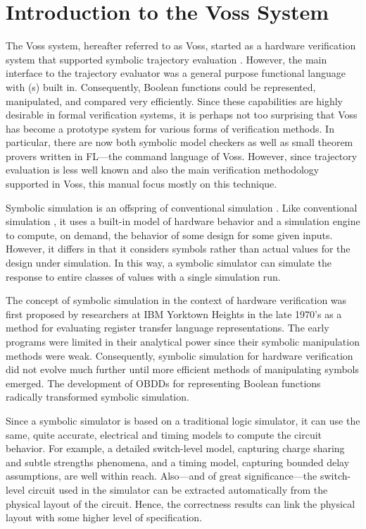 \section{Introduction to the Voss System}

The Voss system, hereafter referred to as Voss, started as a hardware
verification system that supported symbolic trajectory evaluation%
%
{}.
However, the main interface to the trajectory evaluator was a
general purpose functional language%
%
{} with
(s) built in. Consequently, Boolean functions could be
represented, manipulated, and compared very efficiently. Since
these capabilities are highly desirable in formal verification
systems, it is perhaps not too surprising that Voss has become a
prototype system for various forms of verification methods. In
particular, there are now both symbolic model checkers%
%
{} as well as
small theorem provers%
%
{} written in FL---the command language of Voss.
However, since trajectory evaluation is less well known and also
the main verification methodology supported in Voss, this manual
focus mostly on this technique.

Symbolic simulation is an offspring of conventional simulation%
%
{}.
Like conventional simulation%
%
{}, it uses a built-in model of hardware
behavior and a simulation engine%
%
{} to compute, on demand, the behavior
of some design for some given inputs. However, it differs in that
it considers symbols rather than actual values for the design under
simulation. In this way, a symbolic simulator can simulate the
response to entire classes of values with a single simulation run.

The concept of symbolic simulation%
%
{} in the context of hardware
verification was first proposed by researchers at IBM Yorktown
Heights in the late 1970's as a method for evaluating register
transfer language representations. The early programs were limited
in their analytical power since their symbolic manipulation methods
were weak. Consequently, symbolic simulation for hardware verification
did not evolve much further until more efficient methods of
manipulating symbols emerged.
The development of OBDDs for representing Boolean functions
radically transformed symbolic simulation.

Since a symbolic simulator is based on a traditional logic simulator,
it can use the same, quite accurate, electrical and timing models
to compute the circuit behavior. For example, a detailed switch-level
model, capturing charge sharing and subtle strengths phenomena,
and a timing model, capturing bounded delay assumptions, are well
within reach. Also---and of great significance---the switch-level
circuit used in the simulator can be extracted%
%
{} automatically from
the physical layout of the circuit. Hence, the correctness results
can link the physical layout with some higher level of specification.

